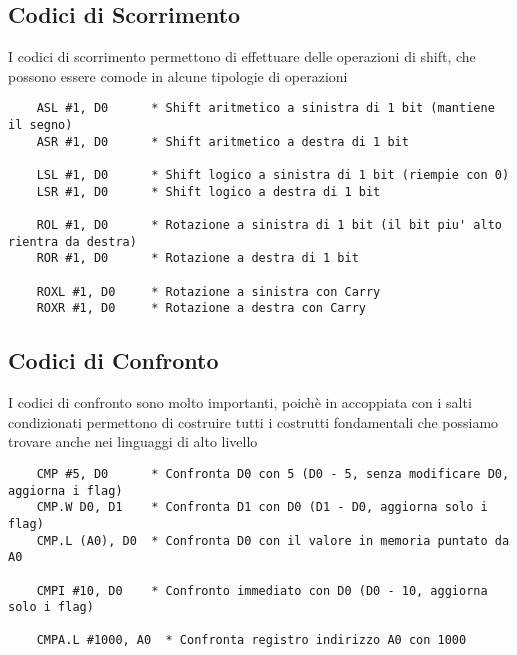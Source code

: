 \subsection{Codici di Scorrimento}
I codici di scorrimento permettono di effettuare delle operazioni di shift, che possono essere comode in alcune tipologie di operazioni
\begin{lstlisting}
    ASL #1, D0      * Shift aritmetico a sinistra di 1 bit (mantiene il segno)  
    ASR #1, D0      * Shift aritmetico a destra di 1 bit  

    LSL #1, D0      * Shift logico a sinistra di 1 bit (riempie con 0)  
    LSR #1, D0      * Shift logico a destra di 1 bit  

    ROL #1, D0      * Rotazione a sinistra di 1 bit (il bit piu' alto rientra da destra)  
    ROR #1, D0      * Rotazione a destra di 1 bit  

    ROXL #1, D0     * Rotazione a sinistra con Carry  
    ROXR #1, D0     * Rotazione a destra con Carry  
\end{lstlisting}

\subsection{Codici di Confronto} \label{par:confronto}
I codici di confronto sono molto importanti, poichè in accoppiata con i salti condizionati permettono di costruire tutti i costrutti fondamentali che possiamo trovare anche nei linguaggi di alto livello
\begin{lstlisting}
    CMP #5, D0      * Confronta D0 con 5 (D0 - 5, senza modificare D0, aggiorna i flag)  
    CMP.W D0, D1    * Confronta D1 con D0 (D1 - D0, aggiorna solo i flag)  
    CMP.L (A0), D0  * Confronta D0 con il valore in memoria puntato da A0  

    CMPI #10, D0    * Confronto immediato con D0 (D0 - 10, aggiorna solo i flag)  

    CMPA.L #1000, A0  * Confronta registro indirizzo A0 con 1000  
\end{lstlisting}


